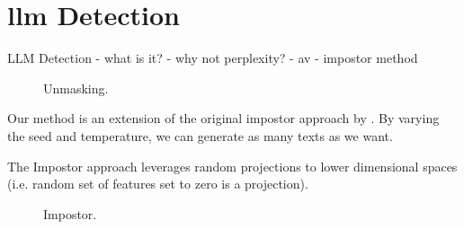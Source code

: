 \chapter{\acs{llm} Detection}
\label{chap:llm_detection}
    LLM Detection
    - what is it?
    - why not perplexity?
    - av
    - impostor method







\begin{figure}[htbp]
    \centering
    
    \caption{Unmasking.}
    \label{fig:unmasking}
\end{figure}
Our method is an extension of the original impostor approach by \citet{koppel_determining_2014}.
By varying the seed and temperature, we can generate as many texts as we want.
  
    
The Impostor approach leverages random projections to lower dimensional spaces (i.e. random set of features set to zero is a projection).
\begin{figure}[htbp]
    \centering
    
    \caption{Impostor.}
    \label{fig:impostor}
\end{figure}


